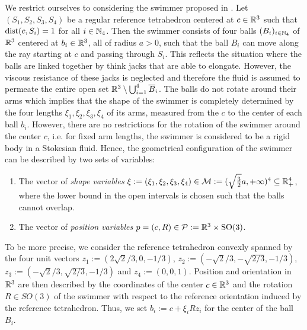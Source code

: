 \label{sec:modelling}
We restrict ourselves to considering the swimmer \spr proposed in \cite{Alouges2013}. Let $(S_1, S_2, S_3, S_4)$ be a regular reference tetrahedron centered at $c \in \mathbb{R}^3$ such that $\operatorname{dist}(c, S_i) = 1$ for all $i \in \mathbb{N}_4$. Then the swimmer consists of four balls $(B_i)_{i \in \mathbb{N}_4}$ of $\mathbb{R}^3$ centered at $b_i \in \mathbb{R}^3$, all of radius $a > 0$, such that the ball $B_i$ can move along the ray starting at $c$ and passing through $S_i$. This reflects the situation where the balls are linked together by think jacks that are able to elongate. However, the viscous resistance of these jacks is neglected and therefore the fluid is assumed to permeate the entire open set $\mathbb{R}^3 \setminus \bigcup_{i = 1}^{4} \overline{B}_i$. The balls do not rotate around their arms which implies that the shape of the swimmer is completely determined by the four lengths $\xi_1, \xi_2, \xi_3, \xi_4$ of its arms, measured from the $c$ to the center of each ball $b_i$. However, there are no restrictions for the rotation of the swimmer around the center $c$, i.e. for fixed arm lengths, the swimmer is considered to be a rigid body in a Stokesian fluid.
Hence, the geometrical configuration of the swimmer can be described by two sets of variables:
\begin{enumerate}
	\item The vector of \emph{shape variables} $\xi := (\xi_1, \xi_2, \xi_3, \xi_4) \in \mathcal{M} := (\sqrt{\tfrac{3}{2}}a, +\infty)^4 \subseteq \mathbb{R}_+^4$, where the lower bound in the open intervals is chosen such that the balls cannot overlap.
	\item The vector of \emph{position variables} $p = (c, R) \in \mathcal{P} :=  \mathbb{R}^3 \times \operatorname{SO}(3)$.
\end{enumerate}
To be more precise, we consider the reference tetrahedron convexly spanned by the four unit vectors $z_1 := (2 \sqrt{2}/3,0,-1/3)$, $z_2 := (-\sqrt{2}/3,-\sqrt{2/3},-1/3)$, $z_3 := (-\sqrt{2}/3,\sqrt{2/3},-1/3)$ and $z_4 := (0,0,1)$. Position and orientation in $\mathbb{R}^3$ are then described by the coordinates of the center $c \in \mathbb{R}^3$ and the rotation $R \in SO(3)$ of the swimmer with respect to the reference orientation induced by the reference tetrahedron. Thus, we set $b_i := c + \xi_i R z_i$ for the center of the ball $B_i$.

